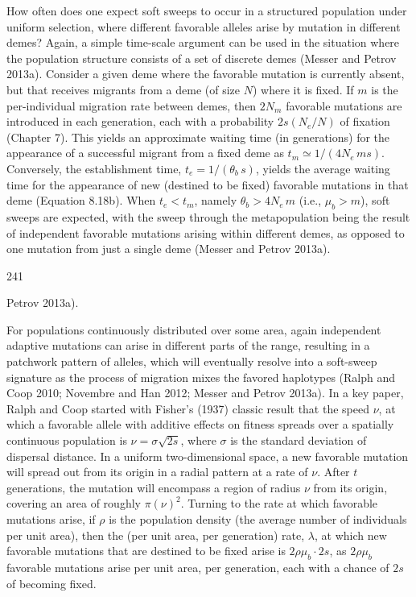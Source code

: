 \documentclass{article}
\begin{document}
How often does one expect soft sweeps to occur in a structured population under uniform selection, where different favorable alleles arise by mutation in different demes? Again, a simple time-scale argument can be used in the situation where the population structure consists of a set of discrete demes (Messer and Petrov 2013a). Consider a given deme where the favorable mutation is currently absent, but that receives migrants from a deme (of size $N$) where it is fixed. If $m$ is the per-individual migration rate between demes, then $2N_m$ favorable mutations are introduced in each generation, each with a probability $2s(N_e/N)$ of fixation (Chapter 7). This yields an approximate waiting time (in generations) for the appearance of a successful migrant from a fixed deme as $t_m \simeq 1/(4N_e \, ms)$. Conversely, the establishment time, $t_e = 1/(\theta_b \, s)$, yields the average waiting time for the appearance of new (destined to be fixed) favorable mutations in that deme (Equation 8.18b). When $t_e < t_m$, namely $\theta_b > 4N_e \, m$ (i.e., $\mu_b > m$), soft sweeps are expected, with the sweep through the metapopulation being the result of independent favorable mutations arising within different demes, as opposed to one mutation from just a single deme (Messer and Petrov 2013a).

241

Petrov 2013a).

For populations continuously distributed over some area, again independent adaptive mutations can arise in different parts of the range, resulting in a patchwork pattern of alleles, which will eventually resolve into a soft-sweep signature as the process of migration mixes the favored haplotypes (Ralph and Coop 2010; Novembre and Han 2012; Messer and Petrov 2013a). In a key paper, Ralph and Coop started with Fisher's (1937) classic result that the speed  $ \nu $, at which a favorable allele with additive effects on fitness spreads over a spatially continuous population is  $ \nu = \sigma \sqrt{2s} $, where  $ \sigma $ is the standard deviation of dispersal distance. In a uniform two-dimensional space, a new favorable mutation will spread out from its origin in a radial pattern at a rate of  $ \nu $. After  $ t $ generations, the mutation will encompass a region of radius  $ \nu $ from its origin, covering an area of roughly  $ \pi(\nu)^2 $. Turning to the rate at which favorable mutations arise, if  $ \rho $ is the population density (the average number of individuals per unit area), then the (per unit area, per generation) rate,  $ \lambda $, at which new favorable mutations that are destined to be fixed arise is  $ 2\rho\mu_b \cdot 2s $, as  $ 2\rho\mu_b $ favorable mutations arise per unit area, per generation, each with a chance of  $ 2s $ of becoming fixed.
\end{document}
